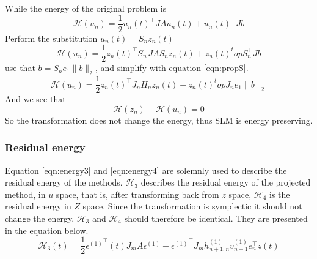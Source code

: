 While the energy of the original problem is 
\begin{equation}
\mathcal{H}(u_n) = \frac{1}{2}u_n(t)^\top J A u_n(t) + u_n(t)^\top J b
\end{equation}
Perform the substitution $ u_n(t) = S_n z_n(t) $
\begin{equation}
\mathcal{H}(u_n) = \frac{1}{2}z_n(t)^\top S_n^\top J A S_n z_n(t) + z_n(t)^top S_n^\top J b
\end{equation}
use that $ b = S_n e_1 \| b \|_2 $, and simplify with equation \eqref{eqn:propS}.
\begin{equation}
\mathcal{H}(u_n) = \frac{1}{2}z_n(t)^\top J_n H_n z_n(t) + z_n(t)^top J_n e_1 \|b \|_2
\end{equation}
And we see that 
\begin{equation}
\mathcal{H}(z_n) - \mathcal{H}(u_n) = 0
\end{equation}
So the transformation does not change the energy, thus SLM is energy preserving. 
\subsubsection{Residual energy}
Equation \eqref{eqn:energy3} and \eqref{eqn:energy4} are solemnly used to describe the residual energy of the methods. $\mathcal{H}_3$ describes the residual energy of the projected method, in $u$ space, that is, after transforming back from $z$ space, $\mathcal{H}_4$ is the residual energy in $Z$ space. Since the transformation is symplectic it should not change the energy, $\mathcal{H}_3$ and $\mathcal{H}_4$ should therefore be identical.
They are presented in the equation below.
\begin{equation}
\mathcal{H}_3 (t) = \frac{1}{2} {\epsilon^{(1)}}^\top (t) J_m A \epsilon^{(1)} + {\epsilon^{(1)}}^\top J_m h_{n+1,n}^{(1)} v_{n+1}^{(1)} e_n^\top z(t)
\label{eqn:energy3}
\end{equation}


